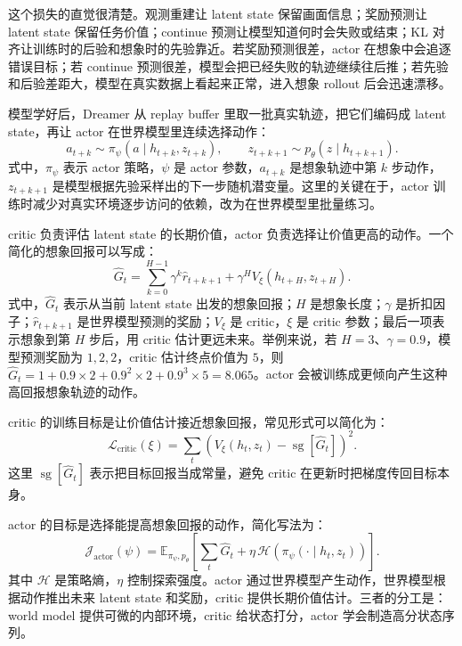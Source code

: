 \documentclass[11pt,a4paper]{ctexart}
\begin{document}
这个损失的直觉很清楚。观测重建让 latent state 保留画面信息；奖励预测让 latent state 保留任务价值；continue 预测让模型知道何时会失败或结束；KL 对齐让训练时的后验和想象时的先验靠近。若奖励预测很差，actor 在想象中会追逐错误目标；若 continue 预测很差，模型会把已经失败的轨迹继续往后推；若先验和后验差距大，模型在真实数据上看起来正常，进入想象 rollout 后会迅速漂移。

模型学好后，Dreamer 从 replay buffer 里取一批真实轨迹，把它们编码成 latent state，再让 actor 在世界模型里连续选择动作：
\begin{equation}
  a_{t+k}\sim \pi_\psi(a\mid h_{t+k},z_{t+k}), \qquad
  z_{t+k+1}\sim p_\theta(z\mid h_{t+k+1}).
\end{equation}
式中，$\pi_\psi$ 表示 actor 策略，$\psi$ 是 actor 参数，$a_{t+k}$ 是想象轨迹中第 $k$ 步动作，$z_{t+k+1}$ 是模型根据先验采样出的下一步随机潜变量。这里的关键在于，actor 训练时减少对真实环境逐步访问的依赖，改为在世界模型里批量练习。

critic 负责评估 latent state 的长期价值，actor 负责选择让价值更高的动作。一个简化的想象回报可以写成：
\begin{equation}
  \hat G_t
  =
  \sum_{k=0}^{H-1}\gamma^k \hat r_{t+k+1}
  +
  \gamma^H V_\xi(h_{t+H},z_{t+H}).
\end{equation}
式中，$\hat G_t$ 表示从当前 latent state 出发的想象回报；$H$ 是想象长度；$\gamma$ 是折扣因子；$\hat r_{t+k+1}$ 是世界模型预测的奖励；$V_\xi$ 是 critic，$\xi$ 是 critic 参数；最后一项表示想象到第 $H$ 步后，用 critic 估计更远未来。举例来说，若 $H=3$、$\gamma=0.9$，模型预测奖励为 $1,2,2$，critic 估计终点价值为 $5$，则 $\hat G_t=1+0.9\times2+0.9^2\times2+0.9^3\times5=8.065$。actor 会被训练成更倾向产生这种高回报想象轨迹的动作。

critic 的训练目标是让价值估计接近想象回报，常见形式可以简化为：
\begin{equation}
  \mathcal L_{\mathrm{critic}}(\xi)
  =
  \sum_t
  \left(
  V_\xi(h_t,z_t)-\operatorname{sg}[\hat G_t]
  \right)^2 .
\end{equation}
这里 $\operatorname{sg}[\hat G_t]$ 表示把目标回报当成常量，避免 critic 在更新时把梯度传回目标本身。

actor 的目标是选择能提高想象回报的动作，简化写法为：
\begin{equation}
  \mathcal J_{\mathrm{actor}}(\psi)
  =
  \mathbb E_{\pi_\psi,p_\theta}
  \left[
  \sum_t \hat G_t
  +
  \eta\,\mathcal H(\pi_\psi(\cdot\mid h_t,z_t))
  \right].
\end{equation}
其中 $\mathcal H$ 是策略熵，$\eta$ 控制探索强度。actor 通过世界模型产生动作，世界模型根据动作推出未来 latent state 和奖励，critic 提供长期价值估计。三者的分工是：world model 提供可微的内部环境，critic 给状态打分，actor 学会制造高分状态序列。
\end{document}
